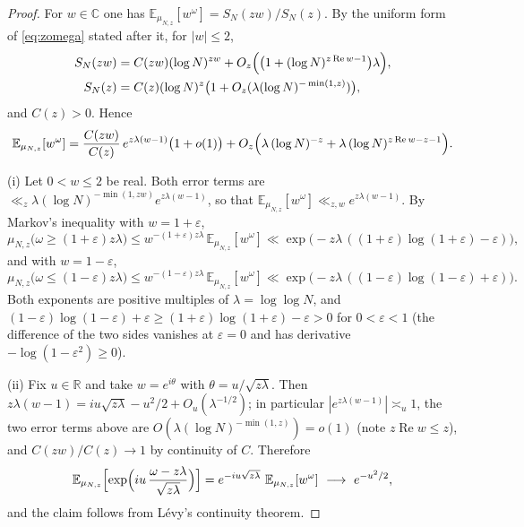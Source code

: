 \documentclass[11pt]{amsart}
\theoremstyle{definition}
\newcommand{\Ee}{\mathbb E}
\newcommand{\re}{\operatorname{Re}}
\newcommand{\loglog}{\log\log}
\begin{document}
\begin{proof}
For $w\in\mathbb C$ one has $\Ee_{\mu_{N,z}}[w^{\omega}]=S_N(zw)/S_N(z)$. By the uniform form of
\eqref{eq:zomega} stated after it, for $|w|\le2$,
\begin{align*}
S_N(zw)&=C(zw)(\log N)^{zw}+O_z\Bigl(\bigl(1+(\log N)^{z\re w-1}\bigr)\lambda\Bigr),\\
S_N(z)&=C(z)(\log N)^z\bigl(1+O_z(\lambda(\log N)^{-\min(1,z)})\bigr),
\end{align*}
and $C(z)>0$. Hence
\begin{equation*}
\Ee_{\mu_{N,z}}[w^{\omega}]=\frac{C(zw)}{C(z)}\,e^{z\lambda(w-1)}\bigl(1+o(1)\bigr)
+O_z\Bigl(\lambda\,(\log N)^{-z}+\lambda\,(\log N)^{z\re w-z-1}\Bigr).
\end{equation*}

(i) Let $0<w\le2$ be real. Both error terms are
$\ll_z\lambda(\log N)^{-\min(1,zw)}e^{z\lambda(w-1)}$, so that
$\Ee_{\mu_{N,z}}[w^{\omega}]\ll_{z,w}e^{z\lambda(w-1)}$. By Markov's inequality with $w=1+\varepsilon$,
\[
\mu_{N,z}\bigl(\omega\ge(1+\varepsilon)z\lambda\bigr)\le w^{-(1+\varepsilon)z\lambda}\,\Ee_{\mu_{N,z}}[w^{\omega}]
\ll\exp\bigl(-z\lambda\,((1+\varepsilon)\log(1+\varepsilon)-\varepsilon)\bigr),
\]
and with $w=1-\varepsilon$,
\[
\mu_{N,z}\bigl(\omega\le(1-\varepsilon)z\lambda\bigr)\le w^{-(1-\varepsilon)z\lambda}\,\Ee_{\mu_{N,z}}[w^{\omega}]
\ll\exp\bigl(-z\lambda\,((1-\varepsilon)\log(1-\varepsilon)+\varepsilon)\bigr).
\]
Both exponents are positive multiples of $\lambda=\loglog N$, and
$(1-\varepsilon)\log(1-\varepsilon)+\varepsilon\ge(1+\varepsilon)\log(1+\varepsilon)-\varepsilon>0$ for
$0<\varepsilon<1$ (the difference of the two sides vanishes at $\varepsilon=0$ and has derivative
$-\log(1-\varepsilon^2)\ge0$).

(ii) Fix $u\in\mathbb R$ and take $w=e^{i\theta}$ with $\theta=u/\sqrt{z\lambda}$. Then
$z\lambda(w-1)=iu\sqrt{z\lambda}-u^2/2+O_u(\lambda^{-1/2})$; in particular
$|e^{z\lambda(w-1)}|\asymp_u1$, the two error terms above are $O(\lambda(\log N)^{-\min(1,z)})=o(1)$ (note
$z\re w\le z$), and $C(zw)/C(z)\to1$ by continuity of $C$. Therefore
\[
\Ee_{\mu_{N,z}}\Bigl[\exp\Bigl(iu\,\frac{\omega-z\lambda}{\sqrt{z\lambda}}\Bigr)\Bigr]
=e^{-iu\sqrt{z\lambda}}\ \Ee_{\mu_{N,z}}[w^{\omega}]\ \longrightarrow\ e^{-u^2/2},
\]
and the claim follows from L\'evy's continuity theorem.
\end{proof}
\end{document}
